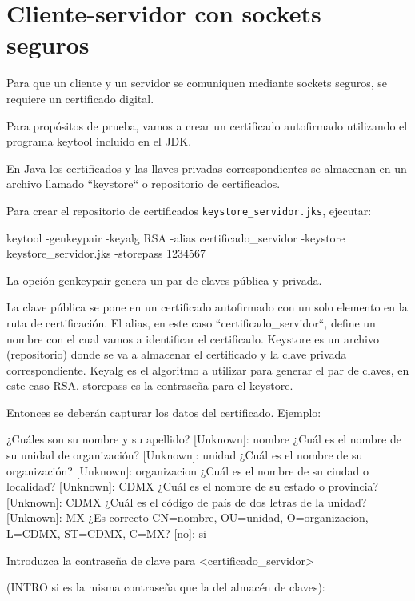 \chapter{Cliente-servidor con sockets seguros}

Para que un cliente y un servidor se comuniquen mediante sockets seguros, se requiere un certificado digital.

Para propósitos de prueba, vamos a crear un certificado autofirmado utilizando el programa keytool incluido en el JDK.

En Java los certificados y las llaves privadas correspondientes se almacenan en un archivo llamado ``keystore`` o repositorio de certificados.

Para crear el repositorio de certificados \texttt{keystore\_servidor.jks}, ejecutar:

\begin{SourceCode}
keytool -genkeypair -keyalg RSA -alias certificado_servidor -keystore keystore_servidor.jks -storepass 1234567
\end{SourceCode}

La opción genkeypair genera un par de claves pública y privada.

La clave pública se pone en un certificado autofirmado con un solo elemento en la ruta de certificación. El alias, en este caso ``certificado\_servidor``, define un nombre con el cual vamos a identificar el certificado. Keystore es un archivo (repositorio) donde se va a almacenar el certificado y la clave privada correspondiente. Keyalg es el algoritmo a utilizar para generar el par de claves, en este caso RSA. storepass es la contraseña para el keystore.

Entonces se deberán capturar los datos del certificado. Ejemplo:

\begin{SourceCode}
¿Cuáles son su nombre y su apellido?
  [Unknown]:  nombre
¿Cuál es el nombre de su unidad de organización?
  [Unknown]:  unidad
¿Cuál es el nombre de su organización?
  [Unknown]:  organizacion
¿Cuál es el nombre de su ciudad o localidad?
  [Unknown]:  CDMX
¿Cuál es el nombre de su estado o provincia?
  [Unknown]:  CDMX
¿Cuál es el código de país de dos letras de la unidad?
  [Unknown]:  MX
¿Es correcto CN=nombre, OU=unidad, O=organizacion, L=CDMX, ST=CDMX, C=MX?
  [no]:  si

Introduzca la contraseña de clave para <certificado_servidor>

(INTRO si es la misma contraseña que la del almacén de claves):
\end{SourceCode}

